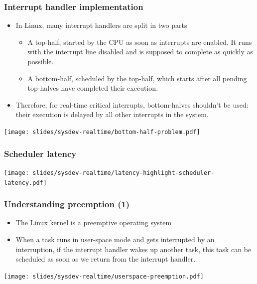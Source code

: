 \begin{frame}
  \frametitle{Interrupt handler implementation}
  \begin{itemize}
  \item In Linux, many interrupt handlers are split in two parts
    \begin{itemize}
    \item A top-half, started by the CPU as soon as interrupts are
      enabled. It runs with the interrupt line disabled and is
      supposed to complete as quickly as possible.
    \item A bottom-half, scheduled by the top-half, which starts after
      all pending top-halves have completed their execution.
    \end{itemize}
  \item Therefore, for real-time critical interrupts, bottom-halves
    shouldn't be used: their execution is delayed by all other
    interrupts in the system.
  \end{itemize}
  \begin{center}
    \texttt{[image: slides/sysdev-realtime/bottom-half-problem.pdf]}
  \end{center}
\end{frame}

\begin{frame}
  \frametitle{Scheduler latency}
  \begin{center}
    \texttt{[image: slides/sysdev-realtime/latency-highlight-scheduler-latency.pdf]}
  \end{center}
\end{frame}

\begin{frame}
  \frametitle{Understanding preemption (1)}
  \begin{itemize}
  \item The Linux kernel is a preemptive operating system
  \item When a task runs in user-space mode and gets interrupted by an
    interruption, if the interrupt handler wakes up another task, this
    task can be scheduled as soon as we return from the interrupt
    handler.
  \end{itemize}
  \begin{center}
    \texttt{[image: slides/sysdev-realtime/userspace-preemption.pdf]}
  \end{center}
\end{frame}

